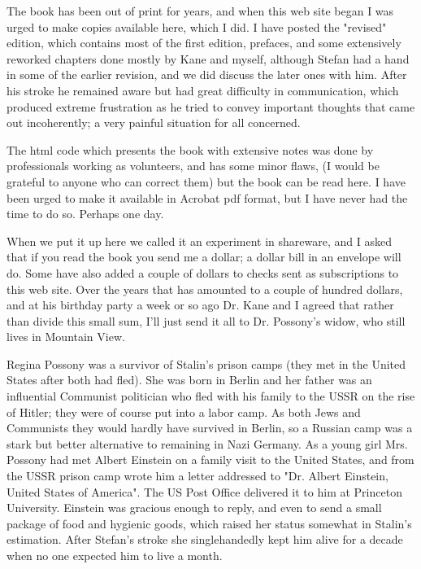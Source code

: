 The book has been out of print for years, and when this web site began I was urged to make copies available here, which I did. I have posted the "revised" edition, which contains most of the first edition, prefaces, and some extensively reworked chapters done mostly by Kane and myself, although Stefan had a hand in some of the earlier revision, and we did discuss the later ones with him. After his stroke he remained aware but had great difficulty in communication, which produced extreme frustration as he tried to convey important thoughts that came out incoherently; a very painful situation for all concerned.

The html code which presents the book with extensive notes was done by professionals working as volunteers, and has some minor flaws, (I would be grateful to anyone who can correct them) but the book can be read here. I have been urged to make it available in Acrobat pdf format, but I have never had the time to do so. Perhaps one day.

When we put it up here we called it an experiment in shareware, and I asked that if you read the book you send me a dollar; a dollar bill in an envelope will do. Some have also added a couple of dollars to checks sent as subscriptions to this web site. Over the years that has amounted to a couple of hundred dollars, and at his birthday party a week or so ago Dr. Kane and I agreed that rather than divide this small sum, I'll just send it all to Dr. Possony's widow, who still lives in Mountain View.

Regina Possony was a survivor of Stalin's prison camps (they met in the United States after both had fled). She was born in Berlin and her father was an influential Communist politician who fled with his family to the USSR on the rise of Hitler; they were of course put into a labor camp. As both Jews and Communists they would hardly have survived in Berlin, so a Russian camp was a stark but better alternative to remaining in Nazi Germany. As a young girl Mrs. Possony had met Albert Einstein on a family visit to the United States, and from the USSR prison camp wrote him a letter addressed to "Dr. Albert Einstein, United States of America". The US Post Office delivered it to him at Princeton University. Einstein was gracious enough to reply, and even to send a small package of food and hygienic goods, which raised her status somewhat in Stalin's estimation. After Stefan's stroke she singlehandedly kept him alive for a decade when no one expected him to live a month.

